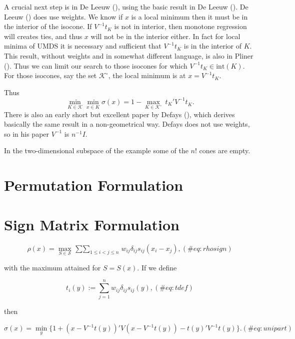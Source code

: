 \documentclass[
  12pt,
  letterpaper,
  DIV=11,
  numbers=noendperiod]{scrreprt}
\theoremstyle{remark}
\begin{document}
A crucial next step is in De Leeuw
(), using the basic result in De
Leeuw (). De Leeuw
() does use weights. We know if \(x\)
is a local minimum then it must be in the interior of the isocone. If
\(V^{-1}t_K\) is not in interior, then monotone regression will creates
ties, and thus \(x\) will not be in the interior either. In fact for
local minima of UMDS it is necessary and sufficient that \(V^{-1}t_K\)
is in the interior of \(K\). This result, without weights and in
somewhat different language, is also in Pliner
(). Thus we can limit our search to those
isocones for which \(V^{-1}t_K\in\text{int}(K)\). For those isocones,
say the set \(\mathcal{K}^\circ\), the local minimum is at
\(x=V^{-1}t_K\).

Thus \[
\min_{K\in\mathcal{K}}\min_{x\in K}\sigma(x)=1 -\max_{K\in\mathcal{K}^\circ}\ t_K'V^{-1}t_K^{\ }.
\] There is also an early short but excellent paper by Defays
(), which derives basically the same
result in a non-geometrical way. Defays does not use weights, so in his
paper \(V^{-1}\) is \(n^{-1}I\).

In the two-dimensional subspace of the example some of the \(n!\) cones
are empty.

\section{Permutation Formulation}\label{permutation-formulation}

\section{Sign Matrix Formulation}\label{sign-matrix-formulation}

\begin{equation}
\rho(x)=\max_{S\in\mathcal{S}}\mathop{\sum\sum}_{1\leq i<j\leq n}w_{ij}\delta_{ij}s_{ij}(x_i-x_j),
(\#eq:rhosign)
\end{equation}

with the maximum attained for \(S=S(x)\). If we define

\begin{equation}
t_i(y):=\sum_{j=1}^n w_{ij}\delta_{ij}s_{ij}(y),
(\#eq:tdef)
\end{equation}

then

\begin{equation}
\sigma(x)=\min_y\{1+(x-V^{-1}t(y))'V(x-V^{-1}t(y))-t(y)'V^{-1}t(y)\}.
(\#eq:unipart)
\end{equation}
\end{document}
